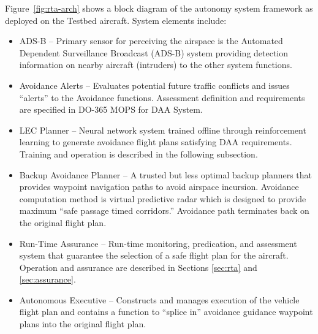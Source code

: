 Figure~\ref{fig:rta-arch} shows a block diagram of the autonomy system framework as deployed on the Testbed aircraft.
System elements include: 
\begin{itemize}
\item ADS-B – Primary sensor for perceiving the airspace is the Automated Dependent Surveillance Broadcast (ADS-B) system providing detection information on  nearby aircraft (intruders) to the other system functions.
\item Avoidance Alerts – Evaluates potential future traffic conflicts and issues “alerts” to the Avoidance functions.  Assessment definition and requirements are specified in DO-365 MOPS for DAA System.
\item LEC Planner -- Neural network system trained offline through reinforcement learning to generate avoidance flight plans satisfying DAA requirements.  Training and operation is described in the following subsection.  
\item Backup Avoidance Planner – A trusted but less optimal backup planners that provides waypoint navigation paths to avoid airspace incursion.  Avoidance computation method is virtual predictive radar which is designed to provide maximum ``safe passage timed corridors.''  Avoidance path terminates back on the original flight plan.
\item Run-Time Assurance  – Run-time monitoring, predication, and assessment system that guarantee the selection of a safe flight plan for the aircraft.  Operation and assurance are described in Sections \ref{sec:rta} and \ref{sec:assurance}.
\item Autonomous Executive – Constructs and manages execution of the vehicle flight plan and contains a function to ``splice in'' avoidance guidance waypoint plans into the original flight plan.
\end{itemize}

